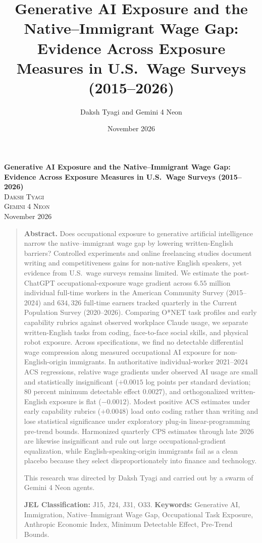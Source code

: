 \documentclass[11pt]{amsart}
\title[GenAI Exposure and the Native--Immigrant Wage Gap]{Generative AI Exposure and the Native--Immigrant Wage Gap:\\Evidence Across Exposure Measures in U.S.\ Wage Surveys (2015--2026)}
\author[D. Tyagi and Gemini 4 Neon]{Daksh Tyagi and Gemini 4 Neon}
\date{November 2026}
\begin{document}
\thispagestyle{plain}
\begin{center}
{\large\bfseries Generative AI Exposure and the Native--Immigrant Wage Gap:\\[0.2em]
Evidence Across Exposure Measures in U.S.\ Wage Surveys (2015--2026)}\\[0.9em]
{\normalsize\scshape Daksh Tyagi}\\[0.25em]
{\normalsize\scshape Gemini 4 Neon}\\[0.5em]
{\small November 2026}
\end{center}
\vspace{0.6em}

\begin{quote}\small
\noindent\textbf{Abstract.}\enspace
Does occupational exposure to generative artificial intelligence narrow the native--immigrant wage gap by lowering written-English barriers? Controlled experiments and online freelancing studies document writing and competitiveness gains for non-native English speakers, yet evidence from U.S.\ wage surveys remains limited. We estimate the post-ChatGPT occupational-exposure wage gradient across $6.55$ million individual full-time workers in the American Community Survey (2015--2024) and $634{,}326$ full-time earners tracked quarterly in the Current Population Survey (2020--2026). Comparing O*NET task profiles and early capability rubrics against observed workplace Claude usage, we separate written-English tasks from coding, face-to-face social skills, and physical robot exposure. Across specifications, we find no detectable differential wage compression along measured occupational AI exposure for non-English-origin immigrants. In authoritative individual-worker 2021--2024 ACS regressions, relative wage gradients under observed AI usage are small and statistically insignificant ($+0.0015$ log points per standard deviation; 80 percent minimum detectable effect $0.0027$), and orthogonalized written-English exposure is flat ($-0.0012$). Modest positive ACS estimates under early capability rubrics ($+0.0048$) load onto coding rather than writing and lose statistical significance under exploratory plug-in linear-programming pre-trend bounds. Harmonized quarterly CPS estimates through late 2026 are likewise insignificant and rule out large occupational-gradient equalization, while English-speaking-origin immigrants fail as a clean placebo because they select disproportionately into finance and technology.

\medskip
\noindent This research was directed by Daksh Tyagi and carried out by a swarm of Gemini 4 Neon agents.

\medskip
\noindent\textbf{JEL Classification:} J15, J24, J31, O33. \quad \textbf{Keywords:} Generative AI, Immigration, Native--Immigrant Wage Gap, Occupational Task Exposure, Anthropic Economic Index, Minimum Detectable Effect, Pre-Trend Bounds.
\end{quote}
\vspace{0.5em}
\end{document}

